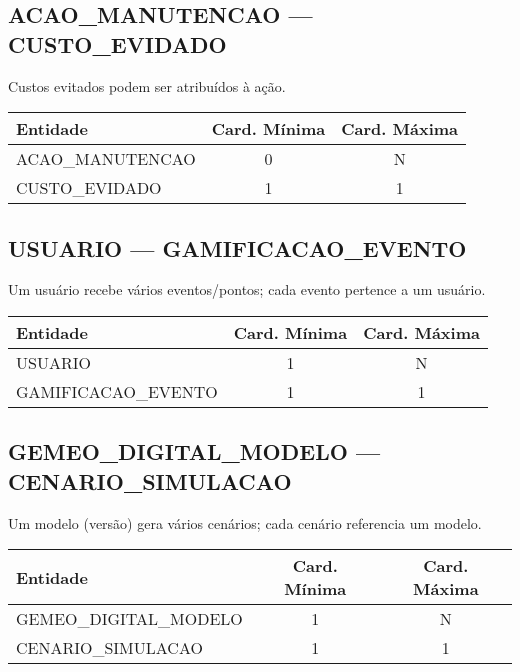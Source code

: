 \documentclass[10pt,a4paper]{article}
\begin{document}
\subsection*{ACAO\_MANUTENCAO — CUSTO\_EVIDADO}
Custos evitados podem ser atribuídos à ação.
\begin{center}
\begin{tabular}{|l|c|c|}
\hline
\rowcolor{vermelhoheader}\color{white}\textbf{Entidade} & \textbf{Card. Mínima} & \textbf{Card. Máxima} \\
\hline
ACAO\_MANUTENCAO & 0 & N \\
CUSTO\_EVIDADO & 1 & 1 \\
\hline
\end{tabular}
\end{center}
\hfill
\subsection*{USUARIO — GAMIFICACAO\_EVENTO}
Um usuário recebe vários eventos/pontos; cada evento pertence a um usuário.
\begin{center}
\begin{tabular}{|l|c|c|}
\hline
\rowcolor{vermelhoheader}\color{white}\textbf{Entidade} & \textbf{Card. Mínima} & \textbf{Card. Máxima} \\
\hline
USUARIO & 1 & N \\
GAMIFICACAO\_EVENTO & 1 & 1 \\
\hline
\end{tabular}
\end{center}
\vspace{0.5cm}

\subsection*{GEMEO\_DIGITAL\_MODELO — CENARIO\_SIMULACAO}
Um modelo (versão) gera vários cenários; cada cenário referencia um modelo.
\begin{center}
\begin{tabular}{|l|c|c|}
\hline
\rowcolor{vermelhoheader}\color{white}\textbf{Entidade} & \textbf{Card. Mínima} & \textbf{Card. Máxima} \\
\hline
GEMEO\_DIGITAL\_MODELO & 1 & N \\
CENARIO\_SIMULACAO & 1 & 1 \\
\hline
\end{tabular}
\end{center}
\hfill
\end{document}
